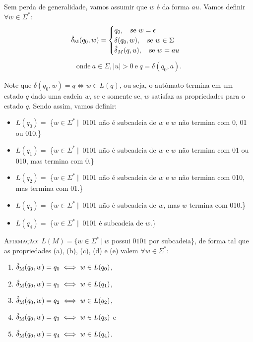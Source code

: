 Sem perda de generalidade, vamos assumir que $w$ é da forma $au$. Vamos definir $\forall w \in \Sigma^*$:
\begin{align*}
\operatorname{\hat{\delta}_M}(q_0, w) = \begin{cases}
                    q_0, \quad \text{se}\ w = \epsilon \\
                    \delta(q_0, w), \quad \text{se}\ w \in \Sigma \\
                    \hat{\delta}_M(q, u), \quad \text{se}\ w = au
                  \end{cases}
\end{align*}
\begin{align*}
    \text{onde} \ a \in \Sigma, |u| > 0 \ \text{e} \ q = \delta(q_0, a).
\end{align*}

Note que $\delta(q_0, w) = q \iff w \in L(q)$, ou seja, o autômato termina em um estado $q$ dado uma cadeia $w$, se e somente se, $w$ satisfaz as propriedades para o estado $q$. Sendo assim, vamos definir:
\begin{itemize}[label={}]
    \item $L(q_0) = $ \{$w \in \Sigma^* \ |\ $ 0101 não é subcadeia de $w$ e $w$ não termina com 0, 01 ou 010.\}
    \item $L(q_1) = $ \{$w \in \Sigma^* \ |\ $ 0101 não é subcadeia de $w$ e $w$ não termina com 01 ou 010, mas termina com 0.\}
    \item $L(q_2) = $ \{$w \in \Sigma^* \ |\ $ 0101 não é subcadeia de $w$ e $w$ não termina com 010, mas termina com 01.\}
    \item $L(q_3) = $ \{$w \in \Sigma^* \ |\ $ 0101 não é subcadeia de $w$, mas $w$ termina com 010.\}
    \item $L(q_4) = $ \{$w \in \Sigma^* \ |\ $ 0101 é subcadeia de $w$.\}
\end{itemize}

\textsc{Afirmação:} $L(M) = \{w \in \Sigma^* \ |\ w$ possui $0101$ por subcadeia\}, de forma tal que as propriedades (a), (b), (c), (d) e (e) valem $\forall w \in \Sigma^*$:
\begin{enumerate}[label=(\alph*)]
    \item $\operatorname{\hat{\delta}_M}(q_0, w) = q_0 \iff w \in L(q_0)$,
    \item $\operatorname{\hat{\delta}_M}(q_0, w) = q_1 \iff w \in L(q_1)$,
    \item $\operatorname{\hat{\delta}_M}(q_0, w) = q_2 \iff w \in L(q_2)$,
    \item $\operatorname{\hat{\delta}_M}(q_0, w) = q_3 \iff w \in L(q_3)$ e
    \item $\operatorname{\hat{\delta}_M}(q_0, w) = q_4 \iff w \in L(q_4)$.
\end{enumerate}

